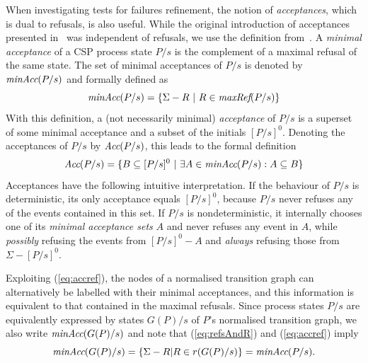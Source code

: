 When investigating  tests for failures refinement, the notion of
\emph{acceptances}, which is dual to refusals,
is also useful. While the original introduction of acceptances presented 
in~\cite[pp.~75]{Hennessy:1988:ATP:50497} was independent of refusals, 
we use the definition from~\cite[pp.~278]{Roscoe:1997:TPC:550448}.   A \emph{minimal acceptance} of a CSP process state $P/s$ 
is the complement of a maximal refusal of the same state. The set of minimal acceptances 
of $P/s$ is denoted by $\text{\it minAcc}(P/s)$ and formally defined as 
%
\begin{equation}\label{eq:accref}
\text{\it minAcc}(P/s) = \{ \Sigma - R~|~R\in \text{\it maxRef}(P/s)  \}
\end{equation}
%
With this definition, a (not necessarily minimal) \emph{acceptance} of $P/s$ is a superset of some minimal acceptance and a subset of the initials $[P/s]^0$. Denoting the acceptances of $P/s$ by $\text{\it Acc}(P/s)$, this leads to the formal definition
\begin{equation}
\label{eq:accrefall}
\text{\it Acc}(P/s)  = \{ B\subseteq [P/s]^0~|~\exists A\in\text{\it minAcc}(P/s):  A \subseteq B   \}
\end{equation}
%
Acceptances have the following intuitive interpretation.  If the behaviour of  $P/s$ is deterministic, its only acceptance
equals $[P/s]^0$, because $P/s$ never refuses any of the events contained in
this set. If $P/s$ is nondeterministic, it internally chooses one of its
\emph{minimal acceptance sets} $A$ and never refuses any event in $A$, while
{\it possibly} refusing the events from $[P/s]^0 - A$ and
{\it always} refusing those from $\Sigma - [P/s]^0$. 


Exploiting (\ref{eq:accref}),
the nodes of a normalised transition graph can
alternatively be labelled with their minimal acceptances, and this
information is equivalent to that contained in the maximal refusals. Since
process states $P/s$ are equivalently expressed by states $G(P)/s$ of $P$'s
normalised transition graph, we also write $\text{\it minAcc}(G(P)/s)$ and
note that (\ref{eq:refsAndR}) and (\ref{eq:accref}) imply
\begin{equation}\label{eq:maxrefsminaccs}
\text{\it minAcc}(G(P)/s) = \{ \Sigma - R | R\in r(G(P)/s) \} = \text{\it minAcc}(P/s).
\end{equation}

